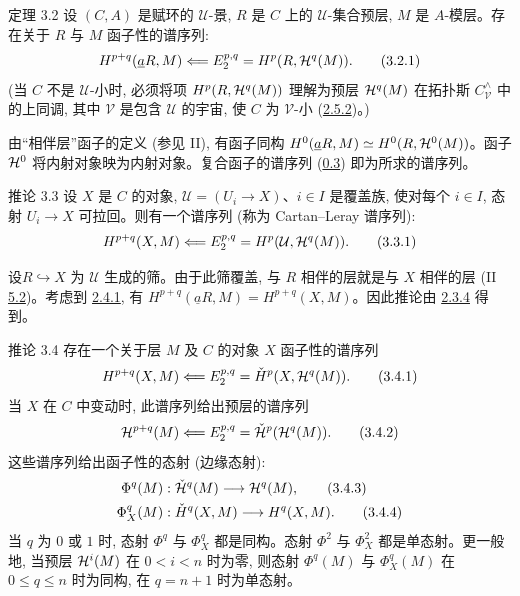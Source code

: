 \begin{enonce*}{定理 3.2}
设 $(C,A)$ 是赋环的 $𝒰$-景, $R$ 是 $C$ 上的 $𝒰$-集合预层, $M$ 是 $A$-模层。存在关于 $R$ 与 $M$ 函子性的谱序列:
\begin{equation*}
H^{p+q}(\underline{a}R,M)\Longleftarrow E^{p,q}_2=
H^p(R,{\mathcal H}^q(M)){}.
\tag{3.2.1}
\end{equation*}
(当 $C$ 不是 $𝒰$-小时, 必须将项 $H^p(R,{\mathcal H}^q(M))$ 理解为预层 ${\mathcal H}^q(M)$ 在拓扑斯 $C^{\wedge}_{𝒱}$ 中的上同调, 其中 $𝒱$ 是包含 $𝒰$ 的宇宙, 使 $C$ 为 $𝒱$-小 (\hyperref[V.subsubsec2.5.2]{2.5.2})。)
\end{enonce*}

由“相伴层”函子的定义 (参见 II), 有函子同构 $H^{0}(\underline{a}R,M)\simeq H^0(R,{\mathcal H}^{0}(M))$。函子 ${\mathcal H}^{0}$ 将内射对象映为内射对象。复合函子的谱序列 (\hyperref[V.prop0.3]{0.3}) 即为所求的谱序列。

\begin{enonce*}{推论 3.3}
设 $X$ 是 $C$ 的对象, $\mathcal{U}=(U_i\to X)$、$i\in I$ 是覆盖族, 使对每个 $i\in I$, 态射 $U_i\to X$ 可拉回。则有一个谱序列 (称为 Cartan--Leray 谱序列):
\begin{equation}
H^{p+q}(X,M)\Longleftarrow E^{p,q}_2=
H^p(\mathcal{U},{\mathcal H}^q(M)){}.\tag{3.3.1}
\end{equation}
\end{enonce*}

设\pageoriginale $R\hookrightarrow X$ 为 $\mathcal{U}$ 生成的筛。由于此筛覆盖, 与 $R$ 相伴的层就是与 $X$ 相伴的层 (II \hyperref[II.def5.2]{5.2})。考虑到 \hyperref[V.subsubsec2.4.1]{2.4.1}, 有 $H^{p+q}(\underline{a}R,M)=H^{p+q}(X,M)$。因此推论由 \hyperref[V.prop2.3.4]{2.3.4} 得到。

\begin{enonce*}{推论 3.4}
存在一个关于层 $M$ 及 $C$ 的对象 $X$ 函子性的谱序列
\begin{equation}
H^{p+q}(X,M)\Longleftarrow E^{p,q}_2=
\check{H}^p(X,{\mathcal H}^q(M)){}.\tag{3.4.1}
\end{equation}
当 $X$ 在 $C$ 中变动时, 此谱序列给出预层的谱序列
\begin{equation}
{\mathcal H}^{p+q}(M)\Longleftarrow E^{p,q}_2=
\check{{\mathcal H}}^p({\mathcal H}^q(M)){}.
\tag{3.4.2}
\end{equation}
这些谱序列给出函子性的态射 (边缘态射):
\hypertarget{sga4.exp.V.equation.3.4.3}{}\begin{align*}%
\Phi^q(M)&:\check{\Hh}^q(M)\to\Hh^q(M){\quoi},\tag{3.4.3}\\
\Phi^q_X(M)&:\check{H}^q(X,M)\to H^q(X,M){\quoi}.\tag{3.4.4}
\end{align*}\hypertarget{sga4.exp.V.equation.3.4.4}{}
当 $q$ 为 $0$ 或 $1$ 时, 态射 $\Phi^q$ 与 $\Phi^q_X$ 都是同构。态射 $\Phi^2$ 与 $\Phi^2_X$ 都是单态射。更一般地, 当预层 ${\mathcal H}^i(M)$ 在 $0<i<n$ 时为零, 则态射 $\Phi^q(M)$ 与 $\Phi^q_X(M)$ 在 $0\leq q\leq n$ 时为同构, 在 $q=n+1$ 时为单态射。
\end{enonce*}

